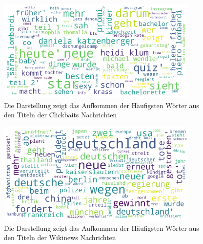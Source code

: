 \begin{figure}[H]
    \centering
    \includegraphics[width=10cm]{kapitel5/wo_click.png}
    \caption[Word Cloud Analyse für die Clickbaits Schlagzeilen]{Die Darstellung zeigt das Aufkommen der Häufigsten Wörter aus den Titeln der Clickbaits Nachrichten}
    \label{Kap5:clwc}
\end{figure}

\begin{figure}[H]
    \centering
    \includegraphics[width=10cm]{kapitel5/news.png}
    \caption[Word Cloud Analyse für die Wikinews Schlagzeilen]{Die Darstellung zeigt das Aufkommen der Häufigsten Wörter aus den Titeln der Wikinews Nachrichten}
    \label{Kap5:clwc}
\end{figure}
